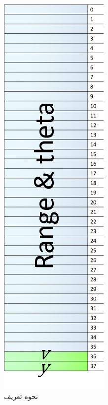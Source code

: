 \begin{figure}
\begin{minipage}{0.3\linewidth}
\centering
\includegraphics[width=0.7\linewidth]{Figures/rzbinary/observation-reward2-note}	
\end{minipage}
\begin{minipage}{0.7\linewidth}
\end{minipage}
\caption{نحوه تعریف }
\label{fig:minipage-next-obs}
\end{figure}



